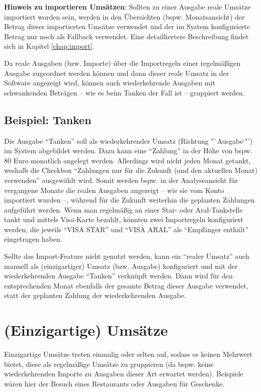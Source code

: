 \begin{infobox}
\textbf{Hinweis zu importieren Umsätzen}: Sollten zu einer Ausgabe reale Umsätze importiert worden sein, werden in den Übersichten (bspw. Monatsansicht) der Betrag dieser importierten Umsätze verwendet und der im System konfigurierte Betrag nur noch als Fallback verwendet. Eine detailliertere Beschreibung findet sich in Kapitel \ref{chap:import}. 
\end{infobox}

Da reale Ausgaben (bzw. Importe) über die Importregeln einer regelmäßigen Ausgabe zugeordnet werden können und dann dieser reale Umsatz in der Software angezeigt wird, können auch wiederkehrende Ausgaben mit schwankenden Beträgen -- wie es beim Tanken der Fall ist -- gruppiert werden.

\subsection*{Beispiel: Tanken}

Die Ausgabe "`Tanken"' soll als wiederkehrender Umsatz (Richtung "`Ausgabe`"') im System abgebildet werden. Dazu kann eine "`Zahlung"' in der Höhe von bspw. 80 Euro monatlich angelegt werden. Allerdings wird nicht jeden Monat getankt, weshalb die Checkbox "`Zahlungen nur für die Zukunft (und den aktuellen Monat) verwenden"' ausgewählt wird. Somit werden bspw. in der Analyseansicht für vergangene Monate die realen Ausgaben angezeigt -- wie sie vom Konto importiert wurden --, während für die Zukunft weiterhin die geplanten Zahlungen aufgeführt werden. Wenn man regelmäßig an einer Star- oder Aral-Tankstelle tankt und mittels Visa-Karte bezahlt, könnten zwei Importregeln konfiguriert werden, die jeweils  "`VISA STAR"' und "`VISA ARAL"' als "`Empfänger enthält"' eingetragen haben. 

Sollte das Import-Feature nicht genutzt werden, kann ein "`realer Umsatz"' auch manuell als (einzigartiger) Umsatz (bzw. Ausgabe) konfiguriert und mit der wiederkehrenden Ausgabe "`Tanken"' verknüpft werden. Dann wird für den entsprechenden Monat ebenfalls der gesamte Betrag dieser Ausgabe verwendet, statt der geplanten Zahlung der wiederkehrenden Ausgabe.


\section{(Einzigartige) Umsätze}

Einzigartige Umsätze treten einmalig oder selten auf, sodass es keinen Mehrwert bietet, diese als regelmäßige Umsätze zu gruppieren (da bspw. keine wiederkehrenden Importe zu Ausgaben dieser Art erwartet werden). Beispiele wären hier der Besuch eines Restaurants oder Ausgaben für Geschenke.

